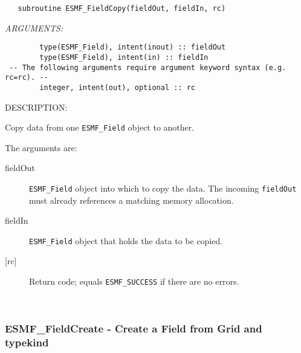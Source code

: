 \begin{verbatim}   subroutine ESMF_FieldCopy(fieldOut, fieldIn, rc)\end{verbatim}{\em ARGUMENTS:}
\begin{verbatim}        type(ESMF_Field), intent(inout) :: fieldOut
        type(ESMF_Field), intent(in) :: fieldIn
 -- The following arguments require argument keyword syntax (e.g. rc=rc). --
        integer, intent(out), optional :: rc\end{verbatim}
{\sf DESCRIPTION:\\ }


   Copy data from one {\tt ESMF\_Field} object to another.
  
   The arguments are:
   \begin{description}
   \item[fieldOut]
   {\tt ESMF\_Field} object into which to copy the data. The incoming
   {\tt fieldOut} must already references a matching memory allocation.
   \item[fieldIn]
   {\tt ESMF\_Field} object that holds the data to be copied.
   \item[{[rc]}]
   Return code; equals {\tt ESMF\_SUCCESS} if there are no errors.
   \end{description}
   
 
\mbox{}\hrulefill\ 
 
\subsubsection [ESMF\_FieldCreate] {ESMF\_FieldCreate - Create a Field from Grid and typekind}



